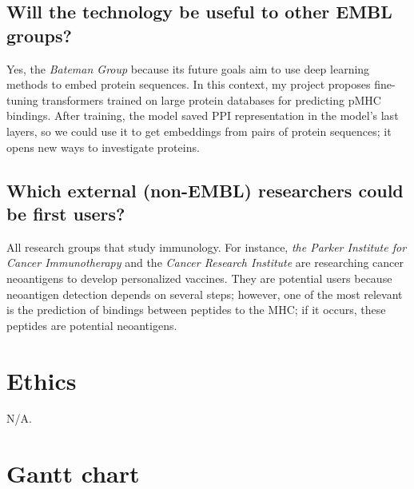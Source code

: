 \documentclass[a4paper,11pt]{article}
\begin{document}
\subsection{Will the technology be useful to other EMBL groups?}
Yes, the \textit{Bateman Group} because its future goals aim to use deep learning methods to embed protein sequences. In this context, my project proposes fine-tuning transformers trained on large protein databases for predicting pMHC bindings. After training, the model saved PPI representation in the model's last layers, so we could use it to get embeddings from pairs of protein sequences; it opens new ways to investigate proteins.

\subsection{Which external (non-EMBL) researchers could be first users?}
All research groups that study immunology. For instance, \textit{the Parker Institute for Cancer Immunotherapy} and the \textit{Cancer Research Institute} are researching cancer neoantigens to develop personalized vaccines. They are potential users because neoantigen detection depends on several steps; however, one of the most relevant is the prediction of bindings between peptides to the MHC; if it occurs, these peptides are potential neoantigens.

\section{Ethics}
N/A.

\section{Gantt chart}


	
	

\clearpage
	
	
	
	
\end{document}
